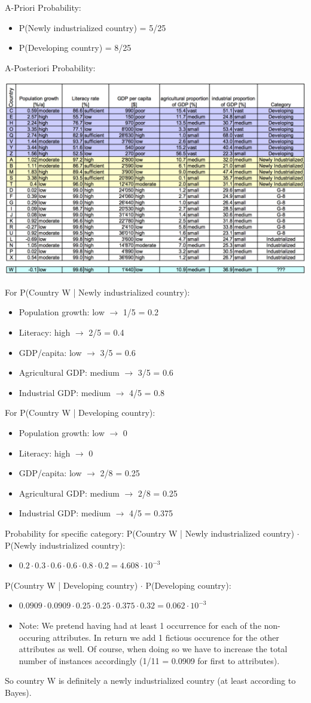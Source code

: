 \begin{breakbox}
\newline \textcolor{Emerald}{A-Priori Probability:}
\begin{itemize}
	\item P(Newly industrialized country) = 5/25
	\item P(Developing country) = 8/25
\end{itemize}
\textcolor{Emerald}{A-Posteriori Probability:}
\begin{center}
\includegraphics[width=.15\textwidth]{slides_images/naive_bayes_table}
\end{center}
For P(Country W | Newly industrialized country):
\begin{itemize}
	\item Population growth: low $\rightarrow$ 1/5 = 0.2
	\item Literacy: high $\rightarrow$  2/5 = 0.4
	\item GDP/capita: low $\rightarrow$ 3/5 = 0.6
	\item Agricultural GDP: medium $\rightarrow$ 3/5 = 0.6
	\item Industrial GDP: medium $\rightarrow$ 4/5 = 0.8
\end{itemize}
For P(Country W | Developing country):
\begin{itemize}
	\item Population growth: low $\rightarrow$ 0
	\item Literacy: high $\rightarrow$  0
	\item GDP/capita: low $\rightarrow$ 2/8 = 0.25
	\item Agricultural GDP: medium $\rightarrow$ 2/8 = 0.25
	\item Industrial GDP: medium $\rightarrow$ 4/5 = 0.375
\end{itemize}
\textcolor{Emerald}{Probability for specific category:}
\newline P(Country W | Newly industrialized country) $\cdot$ P(Newly industrialized country):
\begin{itemize}
	\item $0.2 \cdot 0.3 \cdot 0.6 \cdot 0.6 \cdot 0.8 \cdot 0.2 = 4.608 \cdot 10^{-3}$
\end{itemize}
P(Country W | Developing country) $\cdot$ P(Developing country):
\begin{itemize}
	\item $0.0909 \cdot 0.0909 \cdot 0.25 \cdot 0.25 \cdot 0.375 \cdot 0.32 = 0.062 \cdot 10^{-3}$
	\item Note: We pretend having had at least 1 occurrence for each of the non-occuring attributes. In return we add 1 fictious occurence for the other attributes as well. Of course, when doing so we have to increase the total number of instances accordingly (1/11 = 0.0909 for first to attributes).
\end{itemize}
So country W is definitely a newly industrialized country (at least according to Bayes).
\end{breakbox}
